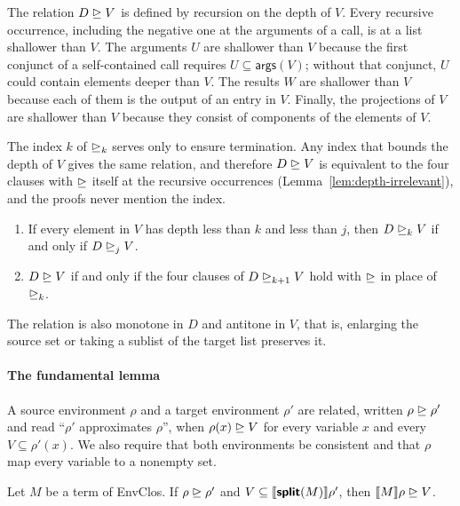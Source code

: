 The relation $D \mathrel{\trianglerighteq} V$ is defined by recursion on the depth of
$V$. Every recursive occurrence, including the negative one at the
arguments of a call, is at a list shallower than $V$. The arguments $U$ are shallower than $V$
because the first conjunct of a self-contained call requires $U \subseteq
\mathsf{args}(V)$; without that conjunct, $U$ could contain elements
deeper than $V$. The results $W$ are shallower than $V$ because each
of them is the output of an entry in $V$. Finally, the projections of
$V$ are shallower than $V$ because they consist of components of the
elements of $V$.

The index $k$ of ${\mathrel{\trianglerighteq}_k}$ serves only to ensure termination. Any
index that bounds the depth of $V$ gives the same relation, and
therefore $D \mathrel{\trianglerighteq} V$ is equivalent to the four clauses with ${\mathrel{\trianglerighteq}}$
itself at the recursive occurrences
(Lemma~\ref{lem:depth-irrelevant}), and the proofs never mention
the index.

\begin{lemma}\label{lem:depth-irrelevant}
\leavevmode
\begin{enumerate}
\item If every element in $V$ has depth less than $k$ and less than
  $j$, then $D \mathrel{\trianglerighteq}_k V$ if and only if $D \mathrel{\trianglerighteq}_j V$.
\item $D \mathrel{\trianglerighteq} V$ if and only if the four clauses of
  $D \mathrel{\trianglerighteq}_{k+1} V$ hold with ${\mathrel{\trianglerighteq}}$ in place of ${\mathrel{\trianglerighteq}_k}$.
\end{enumerate}
\end{lemma}

The relation is also monotone in $D$ and antitone in $V$, that is,
enlarging the source set or taking a sublist of the target list preserves it.

\paragraph{The fundamental lemma}

A source environment $\rho$ and a target environment $\rho'$ are
related, written $\rho \mathrel{\trianglerighteq} \rho'$ and read ``$\rho'$ approximates
$\rho$'', when $\rho(x) \mathrel{\trianglerighteq} V$ for every
variable $x$ and every $V \subseteq \rho'(x)$. We also require that both environments be
consistent and that $\rho$ map every variable to a nonempty set.

\begin{lemma}\label{lem:delay-fundamental}
Let $M$ be a term of EnvClos. If $\rho \mathrel{\trianglerighteq} \rho'$ and
$V \subseteq \llbracket \textsf{\bfseries split}(M) \rrbracket\rho'$, then
$\llbracket M \rrbracket\rho \mathrel{\trianglerighteq} V$.
\end{lemma}

